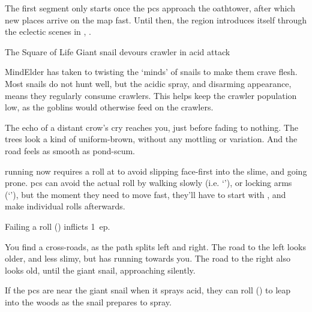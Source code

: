\begin{multicols}{2}

\feyCommentaryFour

\noindent
The first \gls{segment} only starts once the \glspl{pc} approach the \gls{oathtower}, after which new places arrive on the map fast.
Until then, the \gls{region} introduces itself through the eclectic scenes in , .

\label{ravencopsIntro}

{The Square of Life}%
{Giant snail devours \gls{crawler} in acid attack}%

\begin{exampletext}
  \Gls{MindElder} has taken to twisting the `minds' of snails to make them crave flesh.
  Most snails do not hunt well, but the acidic spray, and disarming appearance, means they regularly consume \glspl{crawler}.
  This helps keep the \gls{crawler} population low, as the goblins would otherwise feed on the \glspl{crawler}.
\end{exampletext}

\begin{boxtext}
  The echo of a distant crow's cry reaches you, just before fading to nothing.
  The trees look a kind of uniform-brown, without any mottling or variation.
  And the road feels as smooth as pond-scum.
\end{boxtext}

\Gls{running} now requires a  roll at \tn[7] to avoid slipping face-first into the slime, and going prone.%
\Glspl{pc} can avoid the actual roll by walking slowly (i.e. `'), or locking arms (`'), but the moment they need to move fast, they'll have to start with , and make individual rolls afterwards.

Failing a  roll (\tn[7]) inflicts 1~\gls{ep}.

\begin{boxtext}
  You find a cross-roads, as the path splits left and right.
  The road to the left looks older, and less slimy, but has  running towards you.
  The road to the right also looks old, until the giant snail, approaching silently.
\end{boxtext}

If the \glspl{pc} are near the giant snail when it sprays acid, they can roll  (\tn[7]) to leap into the woods as the snail prepares to spray.


\end{multicols}
